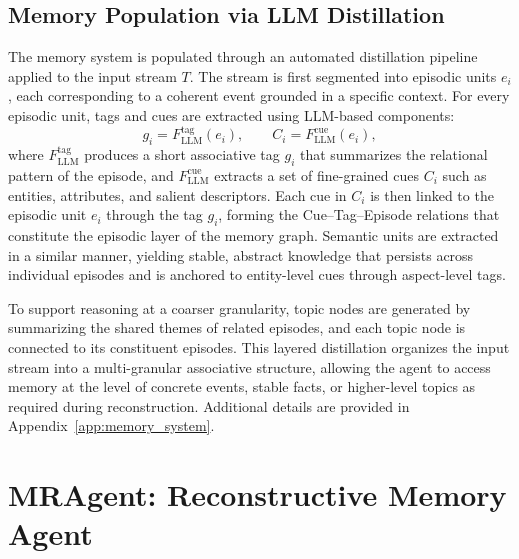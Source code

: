 \documentclass{llmxive}
\begin{document}
\subsection{Memory Population via LLM Distillation}

The memory system is populated through an automated distillation pipeline
applied to the input stream $T$. The stream is first segmented into episodic
units $e_i$, each corresponding to a coherent event grounded in a specific
context. For every episodic unit, tags and cues are extracted using LLM-based
components:
\begin{equation}
    g_i = F_{\text{LLM}}^{\text{tag}}(e_i), \qquad
    C_i = F_{\text{LLM}}^{\text{cue}}(e_i),
\end{equation}
where $F_{\text{LLM}}^{\text{tag}}$ produces a short associative tag $g_i$ that
summarizes the relational pattern of the episode, and
$F_{\text{LLM}}^{\text{cue}}$ extracts a set of fine-grained cues $C_i$ such as
entities, attributes, and salient descriptors. Each cue in $C_i$ is then linked
to the episodic unit $e_i$ through the tag $g_i$, forming the Cue--Tag--Episode
relations that constitute the episodic layer of the memory graph.
Semantic units are extracted in a similar manner, yielding stable, abstract
knowledge that persists across individual episodes and is anchored to
entity-level cues through aspect-level tags. 

To support reasoning at a coarser
granularity, topic nodes are generated by summarizing the shared themes of
related episodes, and each topic node is connected to its constituent episodes.
This layered distillation organizes the input stream into a multi-granular
associative structure, allowing the agent to access memory at the level of
concrete events, stable facts, or higher-level topics as required during
reconstruction.
Additional details are provided in Appendix~\ref{app:memory_system}.

\section{MRAgent: Reconstructive Memory Agent}

% 
\end{document}
